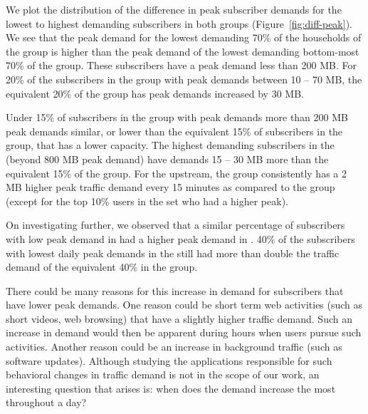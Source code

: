 We plot the distribution of the difference in peak subscriber demands for
the lowest to highest demanding subscribers in both groups (Figure~\ref{fig:diff-peak}).
We see that the peak demand for the lowest demanding 70\% of the households of
the \treatment{} group is higher than the peak demand of the lowest demanding bottom-most
70\% of the \control{} group. These subscribers have a peak demand less than 200 MB.
For 20\% of the subscribers in the \control{} group with peak demands between 10 -- 70 MB,
the equivalent 20\% of the \treatment{} group has peak demands increased by 30 MB.

Under 15\% of subscribers in the \treatment{} group with peak demands more than 200 MB 
peak demands similar, or lower than the equivalent 15\% of subscribers in the \control{}
group, that has a lower capacity. The highest demanding subscribers in the \treatment{}
(beyond 800 MB peak demand) have demands 15 -- 30 MB more than the equivalent 15\% of 
the \control{} group. For the upstream, the \treatment{} group consistently has
a 2 MB higher peak traffic demand every 15 minutes as compared to the \control{} group
(except for the top 10\% users in the \treatment{} set who had a higher peak).


On investigating further, we observed that a similar percentage of 
subscribers with low peak demand in \control{} had a higher peak demand in \treatment{}.
40\% of the subscribers with lowest daily peak demands in the \treatment{} still
had more than double the traffic demand of the equivalent 40\% in the \control{} group.

There could be many reasons for this increase in demand for subscribers that
have lower peak demands. One reason could be short term web activities (such as short videos,
web browsing) that have a slightly higher traffic demand. Such an increase in demand would then
be apparent during hours when users pursue such activities. Another reason could be
an increase in background traffic (such as software updates). Although studying the applications 
responsible for such behavioral changes in traffic demand is not in the scope of our
work, an interesting question that arises is: when does the demand increase the most 
throughout a day?